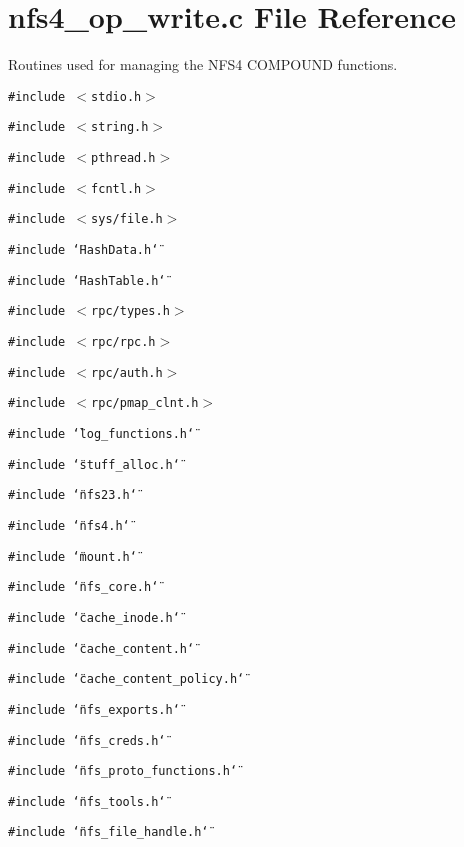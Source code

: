 \section{nfs4\_\-op\_\-write.c File Reference}
\label{nfs4__op__write_8c}
Routines used for managing the NFS4 COMPOUND functions. 

{\tt \#include $<$stdio.h$>$}\par
{\tt \#include $<$string.h$>$}\par
{\tt \#include $<$pthread.h$>$}\par
{\tt \#include $<$fcntl.h$>$}\par
{\tt \#include $<$sys/file.h$>$}\par
{\tt \#include \char`\"{}Hash\-Data.h\char`\"{}}\par
{\tt \#include \char`\"{}Hash\-Table.h\char`\"{}}\par
{\tt \#include $<$rpc/types.h$>$}\par
{\tt \#include $<$rpc/rpc.h$>$}\par
{\tt \#include $<$rpc/auth.h$>$}\par
{\tt \#include $<$rpc/pmap\_\-clnt.h$>$}\par
{\tt \#include \char`\"{}log\_\-functions.h\char`\"{}}\par
{\tt \#include \char`\"{}stuff\_\-alloc.h\char`\"{}}\par
{\tt \#include \char`\"{}nfs23.h\char`\"{}}\par
{\tt \#include \char`\"{}nfs4.h\char`\"{}}\par
{\tt \#include \char`\"{}mount.h\char`\"{}}\par
{\tt \#include \char`\"{}nfs\_\-core.h\char`\"{}}\par
{\tt \#include \char`\"{}cache\_\-inode.h\char`\"{}}\par
{\tt \#include \char`\"{}cache\_\-content.h\char`\"{}}\par
{\tt \#include \char`\"{}cache\_\-content\_\-policy.h\char`\"{}}\par
{\tt \#include \char`\"{}nfs\_\-exports.h\char`\"{}}\par
{\tt \#include \char`\"{}nfs\_\-creds.h\char`\"{}}\par
{\tt \#include \char`\"{}nfs\_\-proto\_\-functions.h\char`\"{}}\par
{\tt \#include \char`\"{}nfs\_\-tools.h\char`\"{}}\par
{\tt \#include \char`\"{}nfs\_\-file\_\-handle.h\char`\"{}}\par
